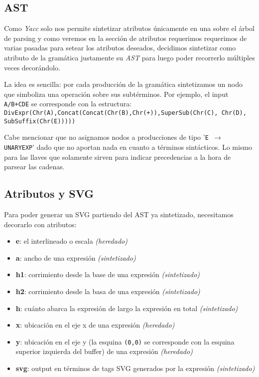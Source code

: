 \subsection{AST}

Como \emph{Yacc} solo nos permite sintetizar atributos únicamente en una  sobre el árbol de parsing y como veremos en la sección de atributos requerimos requerimos de varias pasadas para setear los atributos deseados, decidimos sintetizar como atributo de la gramática justamente su \emph{AST} para luego poder recorrerlo múltiples veces decorándolo. \newline

La idea es sencilla: por cada producción de la gramática sintetizamos un nodo que simboliza una operación sobre sus subtérminos. Por ejemplo, el input \texttt{A/B+C\super D\sub E} se corresponde con la estructura: \newline \texttt{DivExpr(Chr(A),Concat(Concat(Chr(B),Chr(+)),SuperSub(Chr(C), Chr(D), SubSuffix(Chr(E)))))} \newline

Cabe mencionar que no asignamos nodos a producciones de tipo '\texttt{E $\rightarrow$ UNARYEXP}' dado que no aportan nada en cuanto a términos sintácticos. Lo mismo para las llaves que solamente sirven para indicar precedencias a la hora de parsear las cadenas.

\subsection{Atributos y SVG}

Para poder generar un SVG partiendo del AST ya sintetizado, necesitamos decorarlo con atributos:

\begin{itemize}
	\item \textbf{e}: el interlineado o escala \emph{(heredado)}
	\item \textbf{a}: ancho de una expresión \emph{(sintetizado)}
	\item \textbf{h1}: corrimiento  desde la base de una expresión \emph{(sintetizado)}
	\item \textbf{h2}: corrimiento  desde la basa de una expresión \emph{(sintetizado)}
	\item \textbf{h}: cuánto abarca la expresión de largo la expresión en total \emph{(sintetizado)}
	\item \textbf{x}: ubicación en el eje x de una expresión \emph{(heredado)}
	\item \textbf{y}: ubicación en el eje y (la esquina \texttt{(0,0)} se corresponde con la esquina superior izquierda del buffer) de una expresión \emph{(heredado)}
	\item \textbf{svg}: output en términos de tags SVG generados por la expresión \emph{(sintetizado)}
\end{itemize}

